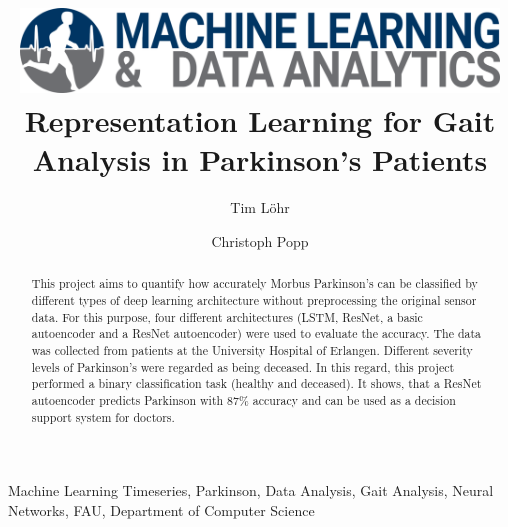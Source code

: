 \documentclass[journal]{IEEEtran}
\begin{document}
    \title{
    	\includegraphics[width=5in]{../imgs/madi_logo.png} 
    	\newline
    	\newline
     Representation Learning for Gait Analysis in Parkinson's Patients \\ 
     }

\author{Tim Löhr}
\author{Christoph Popp}






\maketitle
\begin{abstract}
This project aims to quantify how accurately Morbus Parkinson's can be classified by different types of deep learning architecture without preprocessing the original sensor data. For this purpose, four different architectures (LSTM, ResNet, a basic autoencoder and a ResNet autoencoder) were used to evaluate the accuracy. The data was collected from patients at the University Hospital of Erlangen. Different severity levels of Parkinson's were regarded as being deceased. In this regard, this project performed a binary classification task (healthy and deceased). It shows, that a ResNet autoencoder predicts Parkinson with 87\% accuracy and can be used as a decision support system for doctors. 
\end{abstract}

\begin{IEEEkeywords}
Machine Learning Timeseries, Parkinson, Data Analysis, Gait Analysis, Neural Networks, FAU, Department of Computer Science
\end{IEEEkeywords}

\IEEEpeerreviewmaketitle

\end{document}
